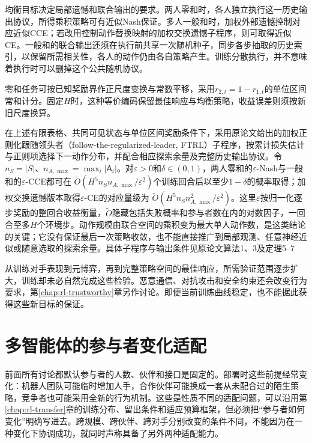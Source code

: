 均衡目标决定局部遗憾和联合输出的要求。两人零和时，各人独立执行这一历史输出协议，所得乘积策略可有近似Nash保证。多人一般和时，加权外部遗憾控制对应近似CCE；若改用控制动作替换映射的加权交换遗憾子程序，则可取得近似CE。一般和的联合输出还须在执行前共享一次随机种子，同步各步抽取的历史索引，以保留所需相关性，各人的动作仍由各自策略产生。训练分散执行，并不意味着执行时可以删掉这个公共随机协议。

零和任务可按已知奖励界作正尺度变换与常数平移，采用$r_{2,t}=1-r_{1,t}$的单位区间常和计分。固定$H$时，这种等价编码保留最佳响应与均衡策略，收益误差则须按新旧尺度换算。

在上述有限表格、共同可见状态与单位区间奖励条件下，采用原论文给出的加权正则化跟随领头者（follow-the-regularized-leader, FTRL）子程序，按累计损失估计与正则项选择下一动作分布，并配合相应探索余量及完整历史输出协议。令$n_S=|S|$、$n_{A,\max}=\max_i|\mathsf A_i|$。对$\varepsilon>0$和$\delta\in(0,1)$，两人零和的$\varepsilon$-Nash与一般和的$\varepsilon$-CCE都可在
$\widetilde O(H^5n_Sn_{A,\max}/\varepsilon^2)$个训练回合后以至少$1-\delta$的概率取得；加权交换遗憾版本取得$\varepsilon$-CE的对应量级为
$\widetilde O(H^5n_Sn_{A,\max}^2/\varepsilon^2)$。这里$\varepsilon$按归一化逐步奖励的整回合收益衡量，$\widetilde O$隐藏包括失败概率和参与者数在内的对数因子，一回合至多$H$个环境步。动作规模由联合空间的乘积变为最大单人动作数，是这类结论的关键；它没有保证最后一次策略收敛，也不能直接推广到局部观测、任意神经近似或随意选取的探索余量。具体子程序与输出条件见原论文算法1、3及定理5--7

从训练对手表现到元博弈，再到完整策略空间的最佳响应，所需验证范围逐步扩大，训练却未必自然完成这些检验。恶意通信、对抗攻击和安全约束还会改变行为要求，第\ref{chap:rl-trustworthy}章另作讨论。即便当前训练曲线稳定，也不能据此获得这些新目标的保证。

\section{多智能体的参与者变化适配}
\label{sec:rl-multi-agent-adaptation}

前面所有讨论都默认参与者的人数、伙伴和接口是固定的。部署时这些前提经常变化：机器人团队可能临时增加人手，合作伙伴可能换成一套从未配合过的陌生策略，竞争者也可能采用全新的行为机制。这些是性质不同的适配问题，可以沿用第\ref{chap:rl-transfer}章的训练分布、留出条件和适应预算框架，但必须把“参与者如何变化”明确写进去。跨规模、跨伙伴、跨对手分别改变的条件不同，不能因为在一种变化下协调成功，就同时声称具备了另外两种适配能力。

